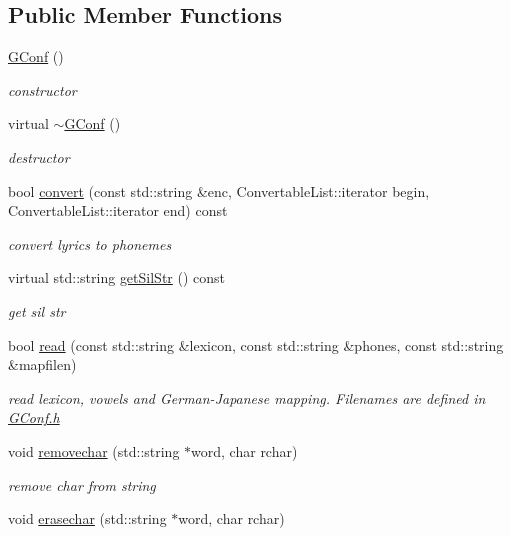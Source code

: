 \subsection*{\-Public \-Member \-Functions}
\begin{DoxyCompactItemize}
\item 
\hypertarget{classsinsy_1_1GConf_a87bf34670529d2dc334e2aaa6fda748a}{\hyperlink{classsinsy_1_1GConf_a87bf34670529d2dc334e2aaa6fda748a}{\-G\-Conf} ()}\label{classsinsy_1_1GConf_a87bf34670529d2dc334e2aaa6fda748a}

\begin{DoxyCompactList}\small\item\em constructor \end{DoxyCompactList}\item 
\hypertarget{classsinsy_1_1GConf_af778492742a433b8f6e739e9ae55048d}{virtual \hyperlink{classsinsy_1_1GConf_af778492742a433b8f6e739e9ae55048d}{$\sim$\-G\-Conf} ()}\label{classsinsy_1_1GConf_af778492742a433b8f6e739e9ae55048d}

\begin{DoxyCompactList}\small\item\em destructor \end{DoxyCompactList}\item 
bool \hyperlink{classsinsy_1_1GConf_a6b4a07d1e386abd95d3d615e0f421e44}{convert} (const std\-::string \&enc, \-Convertable\-List\-::iterator begin, \-Convertable\-List\-::iterator end) const 
\begin{DoxyCompactList}\small\item\em convert lyrics to phonemes \end{DoxyCompactList}\item 
virtual std\-::string \hyperlink{classsinsy_1_1GConf_a0c0a0cbe05ace4e2e378bd5f82bc3bab}{get\-Sil\-Str} () const 
\begin{DoxyCompactList}\small\item\em get sil str \end{DoxyCompactList}\item 
bool \hyperlink{classsinsy_1_1GConf_a231b8129a04810396fc8cd366703c272}{read} (const std\-::string \&lexicon, const std\-::string \&phones, const std\-::string \&mapfilen)
\begin{DoxyCompactList}\small\item\em read lexicon, vowels and \-German-\/\-Japanese mapping. \-Filenames are defined in \hyperlink{GConf_8h_source}{\-G\-Conf.\-h} \end{DoxyCompactList}\item 
void \hyperlink{classsinsy_1_1GConf_aca80b35aa553ade0d65a001043bcbad4}{removechar} (std\-::string $\ast$word, char rchar)
\begin{DoxyCompactList}\small\item\em remove char from string \end{DoxyCompactList}\item 
\hypertarget{classsinsy_1_1GConf_ad6b242a11cb876dc4d971b3f3067403c}{void \hyperlink{classsinsy_1_1GConf_ad6b242a11cb876dc4d971b3f3067403c}{erasechar} (std\-::string $\ast$word, char rchar)}\label{classsinsy_1_1GConf_ad6b242a11cb876dc4d971b3f3067403c}


\end{DoxyCompactItemize}
